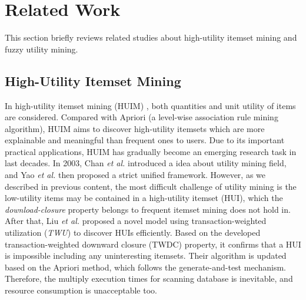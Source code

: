 \documentclass[journal]{IEEEtran}
\begin{document}
\section{Related Work}
\label{sec:relatedWork}

This section briefly reviews related studies about high-utility itemset mining and fuzzy utility mining.

\subsection{High-Utility Itemset Mining}

In high-utility itemset mining (HUIM) \cite{gan2021survey}, both quantities and unit utility of items are considered. Compared with Apriori \cite{agrawal1994fast} (a level-wise association rule mining algorithm), HUIM aims to discover high-utility itemsets which are more explainable and meaningful than frequent ones to users. Due to its important practical applications, HUIM has gradually become an emerging research task in last decades. In 2003, Chan \textit{et al.} \cite{chan2003mining} introduced a idea about utility mining field, and Yao \textit{et al.} \cite{yao2006unified} then proposed a strict unified framework. However, as we described in previous content, the most difficult challenge of utility mining is the low-utility items may be contained in a high-utility itemset (HUI), which the \textit{download-closure} property belongs to frequent itemset mining does not hold in. After that, Liu \textit{et al.} \cite{liu2005two} proposed a novel model using transaction-weighted utilization (\textit{TWU}) to discover HUIs efficiently. Based on the developed transaction-weighted downward closure (TWDC) property, it confirms that a HUI is impossible including any uninteresting itemsets. Their algorithm is updated based on the Apriori method, which follows the generate-and-test mechanism. Therefore, the multiply execution times for scanning database is inevitable, and resource consumption is unacceptable too.
\end{document}
